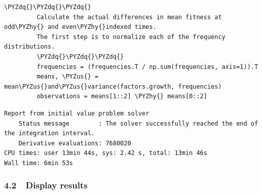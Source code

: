 \documentclass[11pt]{article}
\def\PYZus{\char`\_}
\def\PYZhy{\char`\-}
\def\PYZdq{\char`\"}
\begin{document}
\begin{Verbatim}[commandchars=\\\{\}]
         \PYZdq{}\PYZdq{}\PYZdq{}
         Calculate the actual differences in mean fitness at odd\PYZhy{} and even\PYZhy{}indexed times.
         The first step is to normalize each of the frequency distributions.
         \PYZdq{}\PYZdq{}\PYZdq{}
         frequencies = (frequencies.T / np.sum(frequencies, axis=1)).T
         means, \PYZus{} = mean\PYZus{}and\PYZus{}variance(factors.growth, frequencies)
         observations = means[1::2] \PYZhy{} means[0::2]
\end{Verbatim}


    \begin{Verbatim}[commandchars=\\\{\}]
Report from initial value problem solver
    Status message        : The solver successfully reached the end of the integration interval.
    Derivative evaluations: 7680020
CPU times: user 13min 44s, sys: 2.42 s, total: 13min 46s
Wall time: 6min 53s

    \end{Verbatim}

    \subsubsection{4.2~~Display results}\label{display-results}
\end{document}

